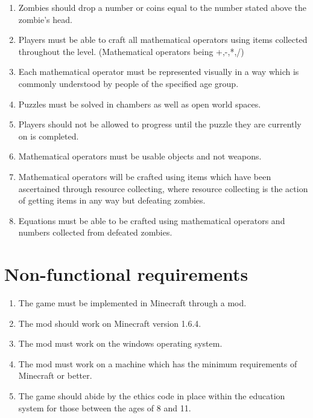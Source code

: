 \begin{enumerate}
	\item Zombies should drop a number or coins equal to the number stated above the zombie's head.
	
	\item Players must be able to craft all mathematical operators using items collected throughout the level. (Mathematical operators being +,-,*,/) 
	
	\item Each mathematical operator must be represented visually in a way which is commonly understood by people of the specified age group.
	
	\item Puzzles must be solved in chambers as well as open world spaces.
	
	\item Players should not be allowed to progress until the puzzle they are currently on is completed.
	
	\item Mathematical operators must be usable objects and not weapons.
	
	\item Mathematical operators will be crafted using items which have been ascertained through resource collecting, where resource collecting is the action of getting items in any way but defeating zombies.
	
	\item Equations must be able to be crafted using mathematical operators and numbers collected from defeated zombies.
		
\end{enumerate}

\section{Non-functional requirements}
\begin{enumerate}
	\item The game must be implemented in Minecraft through a mod.
	\item The mod should work on Minecraft version 1.6.4.
	\item The mod must work on the windows operating system.
	\item The mod must work on a machine which has the minimum requirements of Minecraft or better.
	\item The game should abide by the ethics code in place within the education system for those between the ages of 8 and 11.
\end{enumerate}

